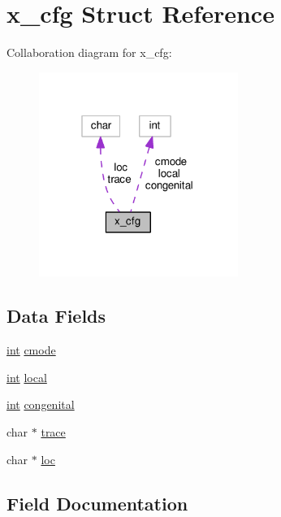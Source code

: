 \hypertarget{structx__cfg}{}\section{x\+\_\+cfg Struct Reference}
\label{structx__cfg}


Collaboration diagram for x\+\_\+cfg\+:
\nopagebreak
\begin{figure}[H]
\begin{center}
\leavevmode
\includegraphics[width=184pt]{structx__cfg__coll__graph}
\end{center}
\end{figure}
\subsection*{Data Fields}
\begin{DoxyCompactItemize}
\item 
\hyperlink{pcre_8txt_a42dfa4ff673c82d8efe7144098fbc198}{int} \hyperlink{structx__cfg_aa20ee6877f74843cf775ecfeee6bf2d1}{cmode}
\item 
\hyperlink{pcre_8txt_a42dfa4ff673c82d8efe7144098fbc198}{int} \hyperlink{structx__cfg_a5e78fdd3a4c42ad4b6ac0444d55c5eff}{local}
\item 
\hyperlink{pcre_8txt_a42dfa4ff673c82d8efe7144098fbc198}{int} \hyperlink{structx__cfg_aa804c441c250348c0bfc29fd86e57e91}{congenital}
\item 
char $\ast$ \hyperlink{structx__cfg_a64b3ffbe4c3bc5a9730aff9f4673eef7}{trace}
\item 
char $\ast$ \hyperlink{structx__cfg_a7b3d8ab6c76da45fbaec99a590b8ff2f}{loc}
\end{DoxyCompactItemize}


\subsection{Field Documentation}
